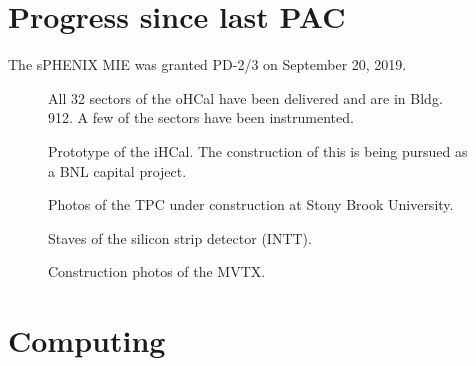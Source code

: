 \section{Progress since last PAC}
\label{sec:progress}

The sPHENIX MIE was granted PD-2/3 on September 20, 2019.

\begin{figure}[!hbt]
 \begin{center}
        \caption{\label{fig:ohcal}All 32 sectors of the oHCal have
        been delivered and are in Bldg. 912.  A few of the sectors have
        been instrumented.}
 \end{center}
\end{figure}

\begin{figure}[!hbt]
 \begin{center}
        \caption{\label{fig:ihcal}Prototype of the iHCal.  The
        construction of this is being pursued as a BNL capital project.}
 \end{center}
\end{figure}

\begin{figure}[!hbt]
 \begin{center}
        \caption{\label{fig:tpc}Photos of the TPC under construction
        at Stony Brook University.}
 \end{center}
\end{figure}

\begin{figure}[!hbt]
 \begin{center}
        \caption{\label{fig:intt}Staves of the silicon strip detector (INTT).}
 \end{center}
\end{figure}

\begin{figure}[!hbt]
 \begin{center}
        \caption{\label{fig:mvtx}Construction photos of the MVTX.}
 \end{center}
\end{figure}


\section{Computing}
\label{sec:computing}


